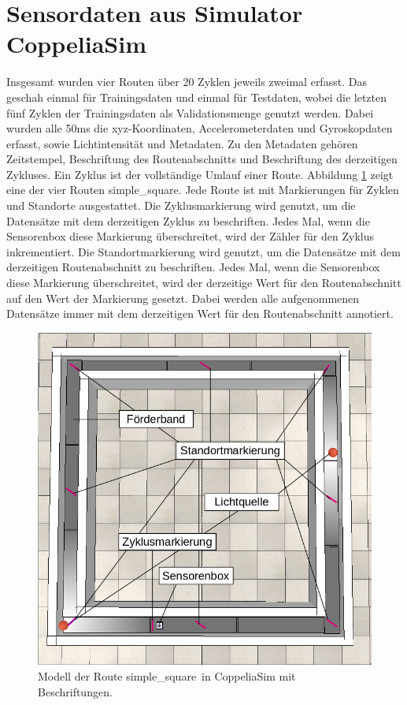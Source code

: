 \section{Sensordaten aus Simulator CoppeliaSim}
Insgesamt wurden vier Routen über 20 Zyklen jeweils zweimal erfasst.
Das geschah einmal für Trainingsdaten und einmal für Testdaten, wobei die letzten fünf Zyklen der
Trainingsdaten als Validationsmenge genutzt werden.
Dabei wurden alle 50ms die xyz-Koordinaten, Accelerometerdaten und Gyroskopdaten erfasst, sowie Lichtintensität und Metadaten.
Zu den Metadaten gehören Zeitstempel, Beschriftung des Routenabschnitts und Beschriftung des derzeitigen Zykluses.
Ein Zyklus ist der vollständige Umlauf einer Route.
\newline
\newline
Abbildung \ref{fig:simple_square_labeled} zeigt eine der vier Routen \glqq simple\_square\grqq.
Jede Route ist mit Markierungen für Zyklen und Standorte ausgestattet.
Die Zyklusmarkierung wird genutzt, um die Datensätze mit dem derzeitigen Zyklus zu beschriften.
Jedes Mal, wenn die Sensorenbox diese Markierung überschreitet, wird der Zähler für den Zyklus inkrementiert.
\newpage
Die Standortmarkierung wird genutzt, um die Datensätze mit dem derzeitigen Routenabschnitt zu beschriften.
Jedes Mal, wenn die Sensorenbox diese Markierung überschreitet, wird der derzeitige Wert für den Routenabschnitt auf den Wert der Markierung gesetzt.
Dabei werden alle aufgenommenen Datensätze immer mit dem derzeitigen Wert für den Routenabschnitt annotiert.
\begin{figure}[h!]
    \centering
    \includegraphics[width=0.75\linewidth]{images/simple_square_labeled.png}
    \caption{Modell der Route \glqq simple\_square\grqq\ in CoppeliaSim mit Beschriftungen.}
    \label{fig:simple_square_labeled}
\end{figure}
